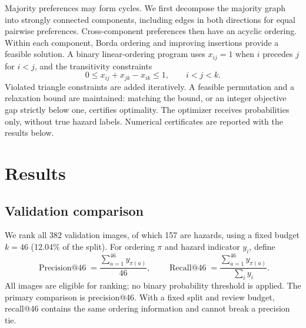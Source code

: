 \documentclass[10pt,a4paper]{article}
\begin{document}
Majority preferences may form cycles. We first decompose the majority graph into
strongly connected components, including edges in both directions for equal
pairwise preferences. Cross-component preferences then have an acyclic ordering.
Within each component, Borda ordering and improving insertions provide a feasible
solution. A binary linear-ordering program uses $x_{ij}=1$ when $i$ precedes $j$
for $i<j$, and the transitivity constraints
\begin{equation}
0\leq x_{ij}+x_{jk}-x_{ik}\leq1,\qquad i<j<k.
\end{equation}
Violated triangle constraints are added iteratively. A feasible permutation and
a relaxation bound are maintained: matching the bound, or an integer objective
gap strictly below one, certifies optimality. The optimizer receives probabilities
only, without true hazard labels. Numerical certificates are reported with the
results below.

\section{Results}
\label{sec:results}
\subsection{Validation comparison}
We rank all 382 validation images, of which 157 are hazards, using a fixed budget
$k=46$ (12.04\% of the split). For ordering $\pi$ and hazard indicator $y_i$, define
\begin{equation}
\operatorname{Precision@46}=\frac{\sum_{a=1}^{46}y_{\pi(a)}}{46},\qquad
\operatorname{Recall@46}=\frac{\sum_{a=1}^{46}y_{\pi(a)}}{\sum_i y_i}.
\end{equation}
All images are eligible for ranking; no binary probability threshold is applied.
The primary comparison is precision@46. With a fixed split and review budget,
recall@46 contains the same ordering information and cannot break a precision tie.
\end{document}
